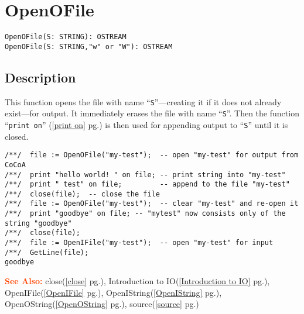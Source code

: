 \documentclass[a4paper]{mybook}
\newenvironment{command}{}{} %
\newcommand\SeeAlso{\par\textcolor{OrangeRed}{\textbf{\large See Also: }}}
\begin{document}
\section{OpenOFile}
\label{OpenOFile}
\begin{command} %


\begin{Verbatim}[label=syntax, rulecolor=\color{MidnightBlue},
frame=single]
OpenOFile(S: STRING): OSTREAM
OpenOFile(S: STRING,"w" or "W"): OSTREAM
\end{Verbatim}


\subsection*{Description}

This function opens the file with name ``\verb&S&''---creating it if it
does not already exist---for output.
It immediately erases the file with name ``\verb&S&''.  Then the function
``\verb&print on&'' (\ref{print on} pg.\pageref{print on}) is then used for appending output to ``\verb&S&''
until it is closed.
\begin{Verbatim}[label=example, rulecolor=\color{PineGreen}, frame=single]
/**/  file := OpenOFile("my-test");  -- open "my-test" for output from CoCoA
/**/  print "hello world! " on file; -- print string into "my-test"
/**/  print " test" on file;         -- append to the file "my-test"
/**/  close(file);  -- close the file
/**/  file := OpenOFile("my-test");  -- clear "my-test" and re-open it
/**/  print "goodbye" on file; -- "mytest" now consists only of the string "goodbye"
/**/  close(file);
/**/  file := OpenIFile("my-test");  -- open "my-test" for input
/**/  GetLine(file);
goodbye
\end{Verbatim}


\SeeAlso %
  close(\ref{close} pg.\pageref{close}), 
    Introduction to IO(\ref{Introduction to IO} pg.\pageref{Introduction to IO}), 
    OpenIFile(\ref{OpenIFile} pg.\pageref{OpenIFile}), 
    OpenIString(\ref{OpenIString} pg.\pageref{OpenIString}), 
    OpenOString(\ref{OpenOString} pg.\pageref{OpenOString}), 
    source(\ref{source} pg.\pageref{source})
\end{command} %
\end{document}
